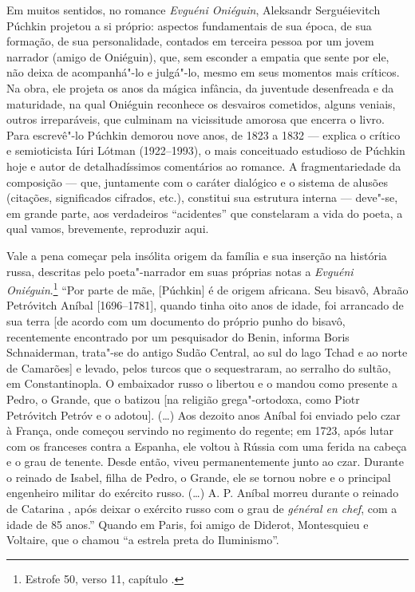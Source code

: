 Em muitos sentidos, no romance \emph{Evguéni Oniéguin},
Aleksandr Serguéievitch Púchkin
projetou a si próprio: aspectos fundamentais de sua época, de sua
formação, de sua personalidade, contados em terceira pessoa por um jovem
narrador (amigo de Oniéguin), que, sem esconder a empatia que sente por
ele, não deixa de acompanhá"-lo e julgá"-lo, mesmo em seus momentos mais
críticos. Na obra, ele projeta os anos da mágica infância, da juventude
desenfreada e da maturidade, na qual Oniéguin reconhece os desvairos
cometidos, alguns veniais, outros irreparáveis, que culminam na
vicissitude amorosa que encerra o livro. Para escrevê"-lo Púchkin demorou
nove anos, de 1823 a 1832 --- explica o crítico e semioticista Iúri
Lótman (1922--1993), o mais conceituado estudioso de
Púchkin hoje e autor de detalhadíssimos comentários ao romance. A
fragmentariedade da composição --- que, juntamente com o caráter dialógico e
o sistema de alusões (citações, significados cifrados, etc.), constitui
sua estrutura interna --- deve"-se, em grande parte, aos verdadeiros
``acidentes'' que constelaram a vida do poeta, a qual vamos, brevemente,
reproduzir aqui.

Vale a pena começar pela insólita origem da família e sua inserção na
história russa, descritas pelo poeta"-narrador em suas próprias notas a
\emph{Evguéni Oniéguin}.\footnote{Estrofe 50, verso 11, capítulo .} ``Por parte
de mãe, [Púchkin] é de origem africana. Seu bisavô, Abraão
Petróvitch Aníbal [1696--1781], quando tinha oito anos de idade, foi
arrancado de sua terra [de acordo com um documento do próprio punho
do bisavô, recentemente encontrado por um pesquisador do Benin, informa
Boris Schnaiderman, trata"-se do antigo Sudão Central, ao sul do lago
Tchad e ao norte de Camarões] e levado, pelos turcos que o
sequestraram, ao serralho do sultão, em Constantinopla. O embaixador
russo o libertou e o mandou como presente a Pedro, o Grande, que o batizou [na religião grega"-ortodoxa, como Piotr
Petróvitch Petróv e o adotou]. (\ldots{}) Aos dezoito anos Aníbal foi enviado pelo czar à França, onde começou servindo no regimento do
regente; em 1723, após lutar com os franceses contra a Espanha, ele
voltou à Rússia com uma ferida na cabeça e o grau de tenente.
Desde então, viveu permanentemente junto ao czar. Durante o
reinado de Isabel, filha de Pedro, o Grande, ele se tornou nobre e o
principal engenheiro militar do exército russo. (\ldots{}) A. P. Aníbal
morreu durante o reinado de Catarina , após deixar o
exército russo com o grau de \emph{général en chef}, com a idade de 85
anos.'' Quando em Paris, foi amigo de Diderot, Montesquieu e Voltaire,
que o chamou ``a estrela preta do Iluminismo''.

